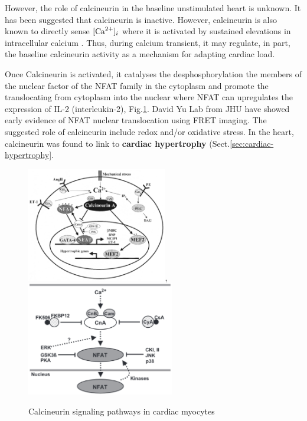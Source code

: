However, the role of calcineurin in the baseline unstimulated heart is unknown.
It has been suggested that calcineurin is inactive. However, calcineurin is also
known to directly sense $[{\text{Ca}^{2+}}]_i$ where it is activated by sustained elevations
in intracellular calcium \citep{crabtree1999, klee1998, dolmetsch1997}.
Thus, during calcium transient, it may regulate, in part, the baseline
calcineurin activity as a mechanism for adapting cardiac load. 


Once Calcineurin is activated, it catalyses the desphosphorylation the members
of the nuclear factor of the NFAT family in the cytoplasm and promote the
translocating from cytoplasm into the nuclear where NFAT can upregulates the
expression of IL-2 (interleukin-2), Fig.\ref{fig:Calcineurin_pathway}. David Yu
Lab from JHU have showed early evidence of NFAT nuclear translocation using FRET
imaging. The suggested role of calcineurin include redox and/or oxidative
stress. In the heart, calcineurin was found to link to {\bf cardiac hypertrophy}
(Sect.\ref{sec:cardiac-hypertrophy}.



\begin{figure}[hbt]
  \centerline{\includegraphics[height=5cm,
    angle=0]{./images/Calcineurin.eps}, \includegraphics[height=5cm,
    angle=0]{./images/Calcineurin_2.eps}}
  \caption{Calcineurin signaling pathways in cardiac myocytes \citep{wilkins2002cac}}
  \label{fig:Calcineurin_pathway}
\end{figure}

